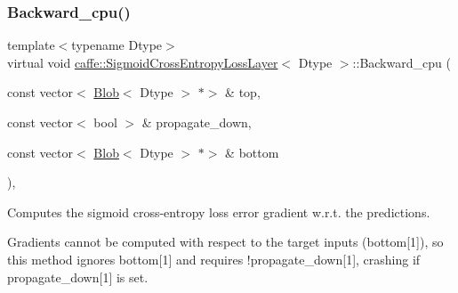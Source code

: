 \subsubsection{\texorpdfstring{Backward\+\_\+cpu()}{Backward\_cpu()}\hspace{0.1cm}{\footnotesize\ttfamily [2/2]}}
{\footnotesize\ttfamily template$<$typename Dtype$>$ \\
virtual void \mbox{\hyperlink{classcaffe_1_1_sigmoid_cross_entropy_loss_layer}{caffe\+::\+Sigmoid\+Cross\+Entropy\+Loss\+Layer}}$<$ Dtype $>$\+::Backward\+\_\+cpu (\begin{DoxyParamCaption}\item[{const vector$<$ \mbox{\hyperlink{classcaffe_1_1_blob}{Blob}}$<$ Dtype $>$ $\ast$$>$ \&}]{top,  }\item[{const vector$<$ bool $>$ \&}]{propagate\+\_\+down,  }\item[{const vector$<$ \mbox{\hyperlink{classcaffe_1_1_blob}{Blob}}$<$ Dtype $>$ $\ast$$>$ \&}]{bottom }\end{DoxyParamCaption})\hspace{0.3cm}{\ttfamily [protected]}, {\ttfamily [virtual]}}



Computes the sigmoid cross-\/entropy loss error gradient w.\+r.\+t. the predictions. 

Gradients cannot be computed with respect to the target inputs (bottom\mbox{[}1\mbox{]}), so this method ignores bottom\mbox{[}1\mbox{]} and requires !propagate\+\_\+down\mbox{[}1\mbox{]}, crashing if propagate\+\_\+down\mbox{[}1\mbox{]} is set.


